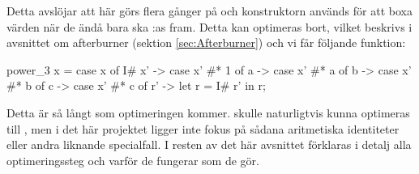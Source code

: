 \documentclass[../Optimise]{subfiles}
\begin{document}
Detta avslöjar att här görs  flera gånger på  och 
konstruktorn  används för att boxa värden
när de ändå bara ska :as fram.
Detta kan optimeras bort, vilket beskrivs i avsnittet om afterburner
(sektion \ref{sec:Afterburner}) och vi får följande funktion:

\begin{codeEx}
power_3 x = case x of
    { I# x' -> case x' #* 1 of
        { a -> case x' #* a of
            { b -> case x' #* b of
                { c -> case x' #* c of
                    { r' -> let r = I# r' in r}}}}};
\end{codeEx}

Detta är så långt som optimeringen kommer.  skulle naturligtvis
kunna optimeras till , men i det här projektet ligger inte fokus på sådana 
aritmetiska identiteter eller andra liknande
specialfall. I resten av det här avsnittet förklaras i detalj alla
optimeringssteg och varför de fungerar som de gör.
\end{document}
